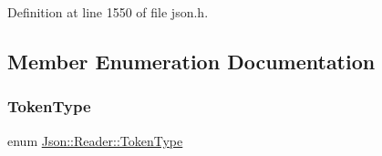 Definition at line 1550 of file json.\+h.



\subsection{Member Enumeration Documentation}
\hypertarget{class_json_1_1_reader_aa35e6ab574dc399a0a645ad98ed66bc9}{}\label{class_json_1_1_reader_aa35e6ab574dc399a0a645ad98ed66bc9} 
\subsubsection{\texorpdfstring{Token\+Type}{TokenType}\hspace{0.1cm}{\footnotesize\ttfamily [1/2]}}
{\footnotesize\ttfamily enum \hyperlink{class_json_1_1_reader_aa35e6ab574dc399a0a645ad98ed66bc9}{Json\+::\+Reader\+::\+Token\+Type}\hspace{0.3cm}{\ttfamily [private]}}

